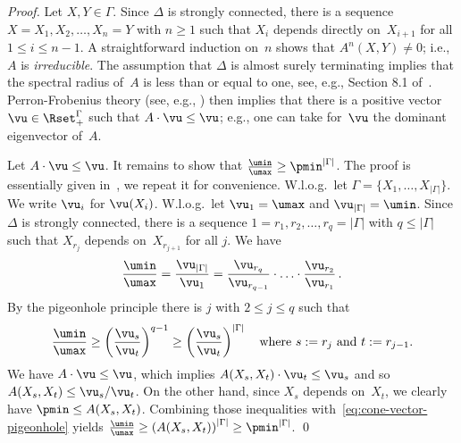 \begin{proof}
  Let $X,Y \in \Gamma$.
  Since $\Delta$ is strongly connected, there is a sequence $X = X_1, X_2, \ldots, X_n = Y$ with $n \ge 1$ such that $X_i$ depends directly on~$X_{i+1}$
   for all $1 \le i \le n-1$.
  A straightforward induction on~$n$ shows that $A^n(X,Y) \ne 0$; i.e., $A$ is {\em irreducible}.
  The assumption that $\Delta$ is almost surely terminating implies that
   the spectral radius of~$A$ is less than or equal to one, see, e.g., Section 8.1 of~\cite{EY:RMC-SG-equations-JACM}.
Perron-Frobenius theory (see, e.g., \cite{book:BermanP}) then implies that there is a positive vector $\vu \in \Rset_+^\Gamma$ such that
   $A \cdot \vu \le \vu$;
   e.g., one can take for~$\vu$ the dominant eigenvector of~$A$.

  Let $A \cdot \vu \le \vu$.
  It remains to show that $\frac{\umin}{\umax} \ge \pmin^{|\Gamma|}$.
  The proof is essentially given in~\cite{EKL10:SICOMP}, we repeat it for convenience.
  W.l.o.g.\ let $\Gamma = \{X_1, \ldots, X_{|\Gamma|}\}$.
  We write $\vu_i$ for $\vu(X_i)$.
  W.l.o.g.\ let $\vu_1 = \umax$ and $\vu_{|\Gamma|} = \umin$.
  Since $\Delta$ is strongly connected, there is a sequence $1 = r_1, r_2, \ldots, r_q = |\Gamma|$ with $q \le |\Gamma|$
   such that $X_{r_j}$ depends on~$X_{r_{j+1}}$ for all $j$.
  We have
   \[
    \frac{\umin}{\umax} = \frac{\vu_{|\Gamma|}}{\vu_1} = \frac{\vu_{r_q}}{\vu_{r_{q-1}}} \cdot \ldots \cdot \frac{\vu_{r_2}}{\vu_{r_1}} \,.
   \]
  By the pigeonhole principle there is $j$ with $2 \le j \le q$ such that
   \begin{equation}
    \frac{\umin}{\umax} \ge \left( \frac{\vu_s}{\vu_t} \right)^{q-1} \ge \left( \frac{\vu_s}{\vu_t} \right)^{|\Gamma|}\quad
      \text{where $s := r_j$ and $t := r_{j-1}$.} \label{eq:cone-vector-pigeonhole}
   \end{equation}
  We have $A \cdot \vu \le \vu$, which implies $A(X_s, X_t) \cdot \vu_t \le \vu_s$ and so $A(X_s, X_t) \le {\vu_s}/{\vu_t}$.
  On the other hand, since $X_s$ depends on~$X_t$, we clearly have $\pmin \le A(X_s, X_t)$.
  Combining those inequalities with~\eqref{eq:cone-vector-pigeonhole} yields $\frac{\umin}{\umax} \ge \left(A(X_s, X_t)\right)^{|\Gamma|} \ge \pmin^{|\Gamma|}$.
\qed
\end{proof}

